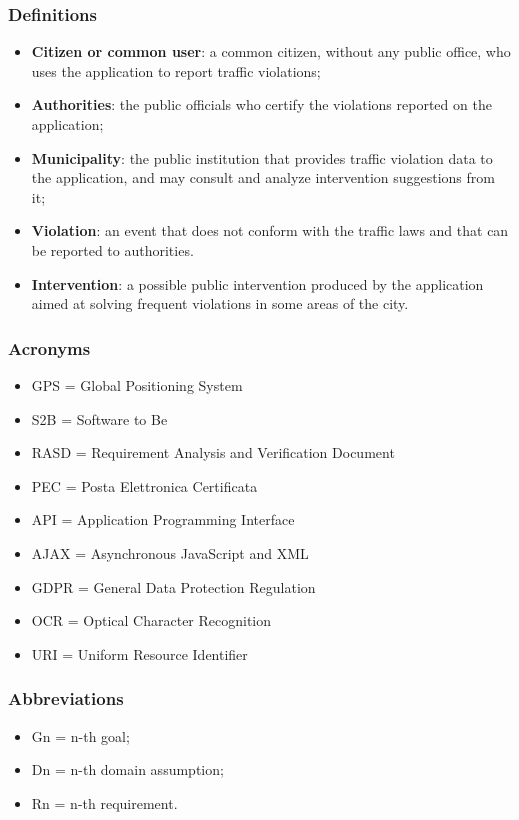 \subsubsection{Definitions}
	\begin{itemize}
		\item \textbf{Citizen or common user}: a common citizen, without any public office, who uses the application to report traffic violations;
		\item \textbf{Authorities}: the public officials who certify the violations reported on the application;
		\item \textbf{Municipality}: the public institution that provides traffic violation data to the application, and may consult and analyze intervention suggestions from it;
		\item \textbf{Violation}: an event that does not conform with the traffic laws and that can be reported to authorities.
		\item \textbf{Intervention}: a possible public intervention produced by the application aimed at solving frequent violations in some areas of the city.
	\end{itemize}
\subsubsection{Acronyms}
\begin{itemize}
	\item GPS = Global Positioning System
	\item S2B = Software to Be
	\item RASD = Requirement Analysis and Verification Document
	\item PEC = Posta Elettronica Certificata
	\item API = Application Programming Interface
	\item AJAX = Asynchronous JavaScript and XML
	\item GDPR = General Data Protection Regulation
	\item OCR = Optical Character Recognition
	\item URI = Uniform Resource Identifier
\end{itemize}
\subsubsection{Abbreviations}
\begin{itemize}
	\item Gn = n-th goal;
	\item Dn = n-th domain assumption;
	\item Rn = n-th requirement.
\end{itemize}